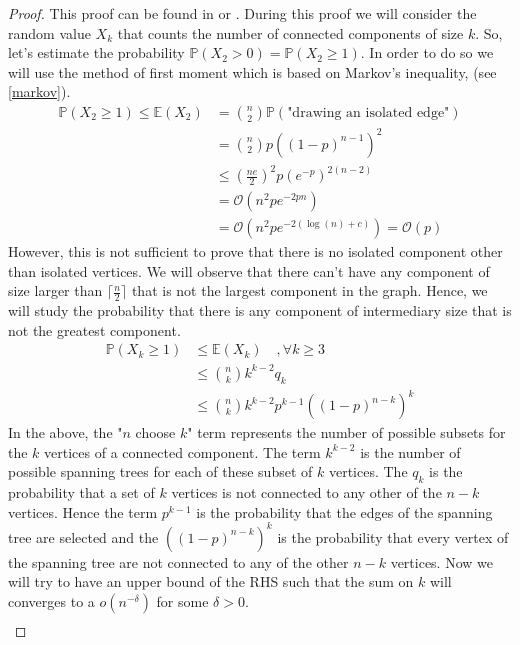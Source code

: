 \begin{proof}
This proof can be found in \cite{Spencer14} or \cite{Bollob01}.
\newline
During this proof we will consider the random value $X_k$ that counts the number of connected components of size $k$.
So, let's estimate the probability $\mathbb{P}(X_2 > 0) = \mathbb{P}(X_2 \geq 1 )$. In order to do so we will use the method of first moment which is based on Markov's inequality, (see \ref{markov}).
\begin{align}
	\mathbb{P}(X_2 \geq 1) \leq \mathbb{E}(X_2) 	&= \binom{n}{2}\mathbb{P}(\text{"drawing an isolated edge"}) \\
						    	&= \binom{n}{2}p((1-p)^{n-1})^2 \\
							&\leq (\frac{ne}{2})^2p(e^{-p})^{2(n-2)} \\
						    	&= \mathcal{O}\left(n^2p e^{-2pn}\right) \\
							    &= \mathcal{O}(n^2pe^{-2(\log(n) + c)}) = \mathcal{O}(p)
\end{align}
However, this is not sufficient to prove that there is no isolated component other than isolated vertices. We will observe that there can't have any component of size larger than $\lceil \frac{n}{2} \rceil$ that is not the largest component in the graph.
Hence, we will study the probability that there is any component of intermediary size that is not the greatest component.
\begin{align}
	\mathbb{P}(X_k \geq 1) &\leq \mathbb{E}(X_k)\quad, \forall k \geq 3 \\
				&\leq \binom{n}{k} k^{k-2} q_k\\
				&\leq \binom{n}{k} k^{k-2} p^{k-1} ((1-p)^{n-k})^k
\end{align}
In the above, the "$n$ choose $k$" term represents the number of possible subsets for the $k$ vertices of a connected component. 
The term $k^{k-2}$ is the number of possible spanning trees for each of these subset of $k$ vertices. 
The $q_k$ is the probability that a set of $k$ vertices is not connected to any other of the $n-k$ vertices.
Hence the term $p^{k-1}$ is the probability that the edges of the spanning tree are selected and the $((1-p)^{n-k})^k$ is the probability that every vertex of the spanning tree are not connected to any of the other $n-k$ vertices.
\newline 
Now we will try to have an upper bound of the RHS such that the sum on $k$ will converges to a $o(n^{-\delta})$ for some $\delta >0$.
\begin{align}

\end{align}
\end{proof}
